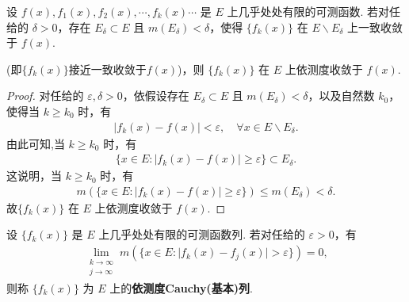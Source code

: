 \documentclass[../../main.tex]{subfiles}
\begin{document}
\begin{theorem}\label{theorem:定理3.15}
设 $f(x),f_1(x),f_2(x),\cdots,f_k(x)\cdots$ 是 $E$ 上几乎处处有限的可测函数. 若对任给的 $\delta>0$，存在 $E_\delta\subset E$ 且 $m(E_\delta)<\delta$，使得 $\{f_k(x)\}$ 在 $E\backslash E_\delta$ 上一致收敛于 $f(x)$.

(即$\{f_k(x)\}$接近一致收敛于$f(x)$)，则 $\{f_k(x)\}$ 在 $E$ 上依测度收敛于 $f(x)$.
\end{theorem}
\begin{proof}
对任给的 $\varepsilon,\delta>0$，依假设存在 $E_\delta\subset E$ 且 $m(E_\delta)<\delta$，以及自然数 $k_0$，使得当 $k\geqslant k_0$ 时，有
\begin{align*}
\vert f_k(x)-f(x)\vert<\varepsilon,\quad \forall x\in E\backslash E_\delta.
\end{align*}
由此可知,当 $k\geqslant k_0$ 时，有
\begin{align*}
\{x\in E:\vert f_k(x)-f(x)\vert\geqslant\varepsilon\}\subset E_\delta.
\end{align*}
这说明，当 $k\geqslant k_0$ 时，有
\begin{align*}
m(\{x\in E:\vert f_k(x)-f(x)\vert\geqslant\varepsilon\})\leqslant m(E_\delta)<\delta.
\end{align*}
故$\{f_k(x)\}$ 在 $E$ 上依测度收敛于 $f(x)$.

\end{proof}

\begin{definition}[依测度Cauchy(基本)列]
设 $\{f_k(x)\}$ 是 $E$ 上几乎处处有限的可测函数列. 若对任给的 $\varepsilon>0$，有
\begin{align*}
\lim_{\substack{k\to\infty\\j\to\infty}}m(\{x\in E:\vert f_k(x)-f_j(x)\vert>\varepsilon\}) = 0,
\end{align*}
则称 $\{f_k(x)\}$ 为 $E$ 上的\textbf{依测度Cauchy(基本)列}.
\end{definition}
\end{document}
